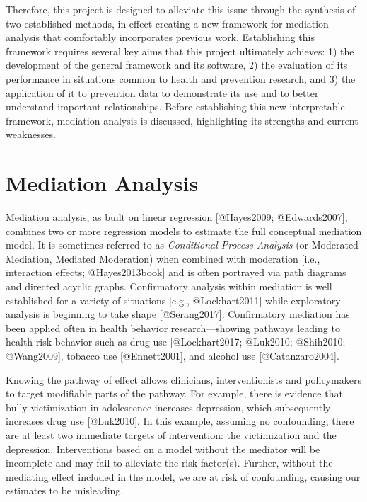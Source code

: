 \documentclass[]{article}
\begin{document}
Therefore, this project is designed to alleviate this issue through the
synthesis of two established methods, in effect creating a new framework
for mediation analysis that comfortably incorporates previous work.
Establishing this framework requires several key aims that this project
ultimately achieves: 1) the development of the general framework and its
software, 2) the evaluation of its performance in situations common to
health and prevention research, and 3) the application of it to
prevention data to demonstrate its use and to better understand
important relationships. Before establishing this new interpretable
framework, mediation analysis is discussed, highlighting its strengths
and current weaknesses.

\section{Mediation Analysis}\label{mediation-analysis}

Mediation analysis, as built on linear regression {[}@Hayes2009;
@Edwards2007{]}, combines two or more regression models to estimate the
full conceptual mediation model. It is sometimes referred to as
\emph{Conditional Process Analysis} (or Moderated Mediation, Mediated
Moderation) when combined with moderation {[}i.e., interaction effects;
@Hayes2013book{]} and is often portrayed via path diagrams and directed
acyclic graphs. Confirmatory analysis within mediation is well
established for a variety of situations {[}e.g., @Lockhart2011{]} while
exploratory analysis is beginning to take shape {[}@Serang2017{]}.
Confirmatory mediation has been applied often in health behavior
research---showing pathways leading to health-risk behavior such as drug
use {[}@Lockhart2017; @Luk2010; @Shih2010; @Wang2009{]}, tobacco use
{[}@Ennett2001{]}, and alcohol use {[}@Catanzaro2004{]}.

Knowing the pathway of effect allows clinicians, interventionists and
policymakers to target modifiable parts of the pathway. For example,
there is evidence that bully victimization in adolescence increases
depression, which subsequently increases drug use {[}@Luk2010{]}. In
this example, assuming no confounding, there are at least two immediate
targets of intervention: the victimization and the depression.
Interventions based on a model without the mediator will be incomplete
and may fail to alleviate the risk-factor(s). Further, without the
mediating effect included in the model, we are at risk of confounding,
causing our estimates to be misleading.
\end{document}
